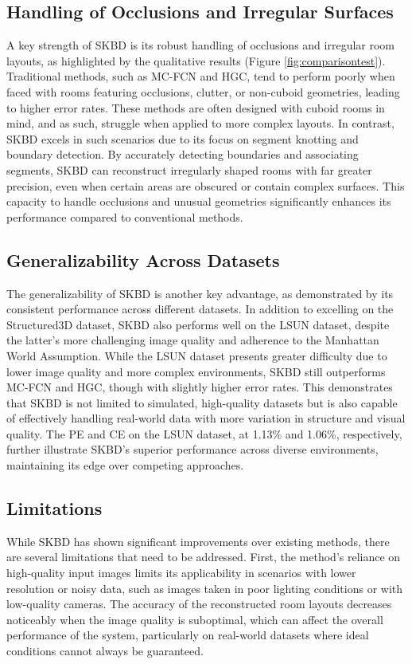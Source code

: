 \subsection{Handling of Occlusions and Irregular Surfaces}
A key strength of SKBD is its robust handling of occlusions and irregular room layouts, as highlighted by the qualitative results (Figure \ref{fig:comparisontest}). Traditional methods, such as MC-FCN and HGC, tend to perform poorly when faced with rooms featuring occlusions, clutter, or non-cuboid geometries, leading to higher error rates. These methods are often designed with cuboid rooms in mind, and as such, struggle when applied to more complex layouts. In contrast, SKBD excels in such scenarios due to its focus on segment knotting and boundary detection. By accurately detecting boundaries and associating segments, SKBD can reconstruct irregularly shaped rooms with far greater precision, even when certain areas are obscured or contain complex surfaces. This capacity to handle occlusions and unusual geometries significantly enhances its performance compared to conventional methods.

\subsection{Generalizability Across Datasets}
The generalizability of SKBD is another key advantage, as demonstrated by its consistent performance across different datasets. In addition to excelling on the Structured3D dataset, SKBD also performs well on the LSUN dataset, despite the latter’s more challenging image quality and adherence to the Manhattan World Assumption. While the LSUN dataset presents greater difficulty due to lower image quality and more complex environments, SKBD still outperforms MC-FCN and HGC, though with slightly higher error rates. This demonstrates that SKBD is not limited to simulated, high-quality datasets but is also capable of effectively handling real-world data with more variation in structure and visual quality. The PE and CE on the LSUN dataset, at 1.13\% and 1.06\%, respectively, further illustrate SKBD’s superior performance across diverse environments, maintaining its edge over competing approaches.

\subsection{Limitations}
While SKBD has shown significant improvements over existing methods, there are several limitations that need to be addressed. First, the method’s reliance on high-quality input images limits its applicability in scenarios with lower resolution or noisy data, such as images taken in poor lighting conditions or with low-quality cameras. The accuracy of the reconstructed room layouts decreases noticeably when the image quality is suboptimal, which can affect the overall performance of the system, particularly on real-world datasets where ideal conditions cannot always be guaranteed.

